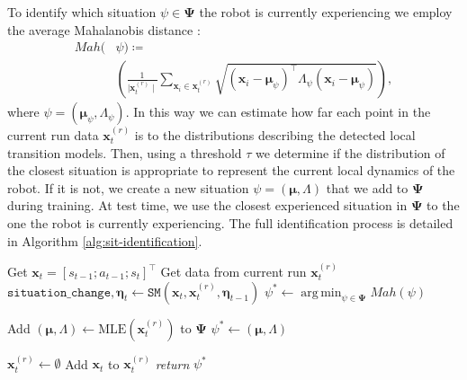 \documentclass[Afour,sageh,times]{sagej}
\DeclareMathOperator*{\argmin}{arg\,min}
\theoremstyle{lemma}
\begin{document}
To identify which situation $\psi \in \boldsymbol{\Psi}$ the robot is currently experiencing we employ the average Mahalanobis distance \cite[]{mahalanobis1930test}:
\begin{align} \label{eq:situation-distance}
    Mah(&\psi) \coloneqq \\ \nonumber &\left( \frac{1}{\mid \boldsymbol{x}^{(r)}_t \mid} \sum_{\boldsymbol{x}_i \in \boldsymbol{x}^{(r)}_t} \sqrt{(\mathbf{x}_i - \boldsymbol{\mu}_{\psi})^\top \Lambda_{\psi} (\mathbf{x}_i - \boldsymbol{\mu}_{\psi})} \right), 
\end{align}
where $\psi = (\boldsymbol{\mu}_{\psi}, \Lambda_{\psi})$. In this way we can estimate how far each point in the current run data $\boldsymbol{x}^{(r)}_t$ is to the distributions describing the detected local transition models. Then, using a threshold $\tau$ we determine if the distribution of the closest situation is appropriate to represent the current local dynamics of the robot. If it is not, we create a new situation $\psi = (\boldsymbol{\mu}, \Lambda)$ that we add to $\boldsymbol{\Psi}$ during training. At test time, we use the closest experienced situation in $\boldsymbol{\Psi}$ to the one the robot is currently experiencing. The full identification process is detailed in Algorithm \ref{alg:sit-identification}.
 
\begin{algorithm}[H]
{
    \small
    \caption{Online Situation Identification $\mathtt{(SI)}$}\label{alg:sit-identification}
    \begin{algorithmic}[1]
        \State Get $\boldsymbol{x}_t = [s_{t-1}; a_{t-1}; s_{t}]^\top$
        \State Get data from current run $\boldsymbol{x}^{(r)}_t$
        \State $\mathtt{situation\_change}, \boldsymbol{\eta}_t \gets \mathtt{SM}(\boldsymbol{x}_t, \boldsymbol{x}^{(r)}_t, \boldsymbol{\eta}_{t-1})$ 
        \State $\psi^* \gets \argmin_{\psi \in \boldsymbol{\Psi}} Mah(\psi)$  

            \State Add $(\boldsymbol{\mu}, \Lambda) \gets \text{MLE}(\boldsymbol{x}_t^{(r)})$ to $\boldsymbol{\Psi}$  
            \State $\psi^* \gets (\boldsymbol{\mu}, \Lambda)$
            \EndIf
            
            \State $\boldsymbol{x}_t^{(r)} \gets \emptyset$    
        \Else
            \State Add $\boldsymbol{x}_t$ to $\boldsymbol{x}_t^{(r)}$
        \EndIf
        \State \textit{return} $\psi^*$

    \end{algorithmic}
}
\end{algorithm}
\end{document}
